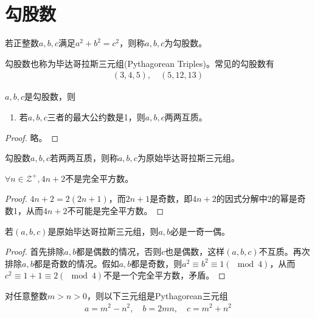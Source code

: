 
\section{勾股数}
\label{sec:pythagorean_triples}

\begin{definition}[勾股数]
  若正整数$a,b,c$满足$a^2+b^2=c^2$，则称$a,b,c$为勾股数。
\end{definition}

勾股数也称为毕达哥拉斯三元组(Pythagorean Triples)。常见的勾股数有
\begin{align*}
  (3,4,5),\quad (5,12,13)
\end{align*}

\begin{property}
  $a,b,c$是勾股数，则
  \begin{enumerate}
  \item 若$a,b,c$三者的最大公约数是1，则$a,b,c$两两互质。
  \end{enumerate}
\end{property}

\begin{proof}
  略。
\end{proof}

\begin{definition}
  勾股数$a,b,c$若两两互质，则称$a,b,c$为原始毕达哥拉斯三元组。
\end{definition}

\begin{lemma}
  $\forall n\in\mathcal{Z}^+, 4n+2$不是完全平方数。
\end{lemma}

\begin{proof}
  $4n+2=2(2n+1)$，而$2n+1$是奇数，即$4n+2$的因式分解中2的幂是奇数1，从而$4n+2$不可能是完全平方数。
\end{proof}

\begin{lemma}
  若$(a,b,c)$是原始毕达哥拉斯三元组，则$a,b$必是一奇一偶。
\end{lemma}

\begin{proof}
  首先排除$a,b$都是偶数的情况，否则$c$也是偶数，这样$(a,b,c)$不互质。再次排除$a,b$都是奇数的情况。假如$a,b$都是奇数，则$a^2\equiv b^2\equiv 1(\mod 4)$，从而$c^2\equiv 1 + 1\equiv 2(\mod 4)$不是一个完全平方数，矛盾。
\end{proof}

\begin{theorem}
  对任意整数$m>n>0$，则以下三元组是Pythagorean三元组
  \begin{align*}
    a=m^2-n^2,\quad b=2mn,\quad c=m^2+n^2
  \end{align*}
\end{theorem}


